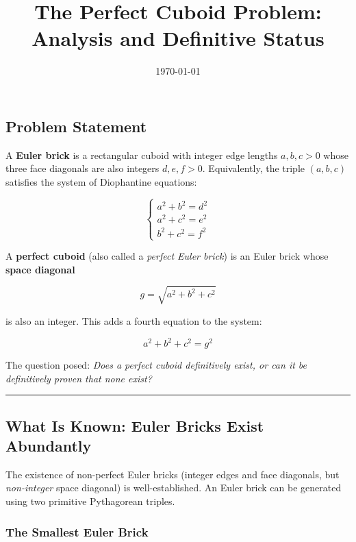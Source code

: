 \documentclass[10pt,a4paper]{article}
\begin{document}
\title{The Perfect Cuboid Problem: Analysis and Definitive Status}
\date{\today}

\maketitle

\subsection{Problem Statement}

A \textbf{Euler brick} is a rectangular cuboid with integer edge lengths $a, b, c > 0$ whose three face diagonals are also integers $d, e, f > 0$. Equivalently, the triple $(a, b, c)$ satisfies the system of Diophantine equations:

\[
\begin{cases}
a^2 + b^2 = d^2 \\
a^2 + c^2 = e^2 \\
b^2 + c^2 = f^2
\end{cases}
\]

A \textbf{perfect cuboid} (also called a \emph{perfect Euler brick}) is an Euler brick whose \textbf{space diagonal}

\[g = \sqrt{a^2 + b^2 + c^2}\]

is also an integer. This adds a fourth equation to the system:

\[a^2 + b^2 + c^2 = g^2\]

The question posed: \emph{Does a perfect cuboid definitively exist, or can it be definitively proven that none exist?}

\begin{center}
\rule{0.5\textwidth}{0.4pt}
\end{center}

\subsection{What Is Known: Euler Bricks Exist Abundantly}

The existence of non-perfect Euler bricks (integer edges and face diagonals, but \emph{non-integer} space diagonal) is well-established. An Euler brick can be generated using two primitive Pythagorean triples.

\subsubsection{The Smallest Euler Brick}
\end{document}
